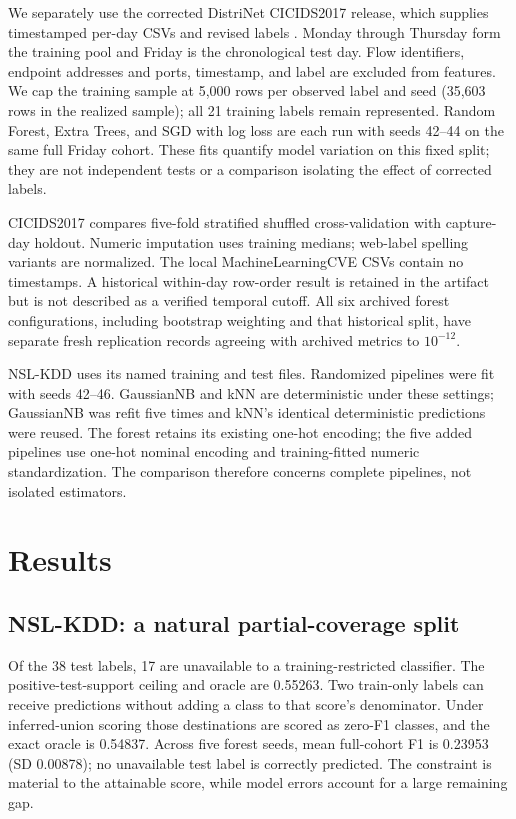 \documentclass[namedate,webpdf,contemporary,large]{TBench-template}
\begin{document}
We separately use the corrected DistriNet CICIDS2017 release, which supplies timestamped per-day CSVs and revised labels \cite{engelen2021,lanvin2023}. Monday through Thursday form the training pool and Friday is the chronological test day. Flow identifiers, endpoint addresses and ports, timestamp, and label are excluded from features. We cap the training sample at 5,000 rows per observed label and seed (35,603 rows in the realized sample); all 21 training labels remain represented. Random Forest, Extra Trees, and SGD with log loss are each run with seeds 42--44 on the same full Friday cohort. These fits quantify model variation on this fixed split; they are not independent tests or a comparison isolating the effect of corrected labels.

CICIDS2017 compares five-fold stratified shuffled cross-validation with capture-day holdout. Numeric imputation uses training medians; web-label spelling variants are normalized. The local MachineLearningCVE CSVs contain no timestamps. A historical within-day row-order result is retained in the artifact but is not described as a verified temporal cutoff. All six archived forest configurations, including bootstrap weighting and that historical split, have separate fresh replication records agreeing with archived metrics to \(10^{-12}\).

NSL-KDD uses its named training and test files. Randomized pipelines were fit with seeds 42--46. GaussianNB and kNN are deterministic under these settings; GaussianNB was refit five times and kNN's identical deterministic predictions were reused. The forest retains its existing one-hot encoding; the five added pipelines use one-hot nominal encoding and training-fitted numeric standardization. The comparison therefore concerns complete pipelines, not isolated estimators.

\section{Results}
\subsection{NSL-KDD: a natural partial-coverage split}
Of the 38 test labels, 17 are unavailable to a training-restricted classifier. The positive-test-support ceiling and oracle are 0.55263. Two train-only labels can receive predictions without adding a class to that score's denominator. Under inferred-union scoring those destinations are scored as zero-F1 classes, and the exact oracle is 0.54837. Across five forest seeds, mean full-cohort F1 is 0.23953 (SD 0.00878); no unavailable test label is correctly predicted. The constraint is material to the attainable score, while model errors account for a large remaining gap.
\end{document}
